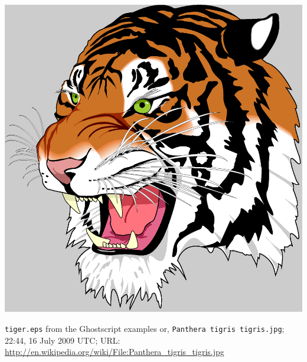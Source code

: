 \documentclass{jsarticle}
\begin{document}
\includegraphics[width=15cm]{tiger.eps}

\verb|tiger.eps| from the Ghostscript examples or,
\verb|Panthera tigris tigris.jpg|; 22:44, 16 July 2009 UTC; URL: \url{http://en.wikipedia.org/wiki/File:Panthera_tigris_tigris.jpg}
\end{document}
